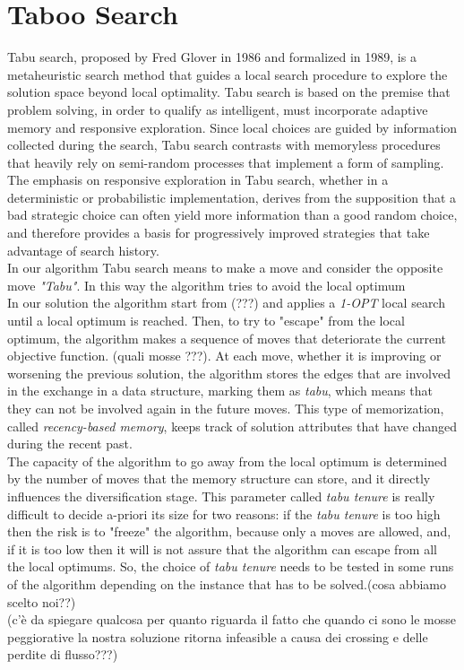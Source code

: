 \section{Taboo Search}
Tabu search, proposed by Fred Glover in 1986 and formalized in 1989, is a metaheuristic search method that guides a local search procedure to explore the solution space beyond local optimality. Tabu search is based on the premise that problem solving, in order to qualify as intelligent, must incorporate adaptive memory and responsive exploration. Since local choices are guided by information collected during the search, Tabu search contrasts with memoryless procedures that heavily rely on semi-random processes that implement a form of sampling. The emphasis on responsive exploration in Tabu search, whether in a deterministic or probabilistic implementation, derives from the supposition that a bad strategic choice can often yield more information than a good random choice, and therefore provides a basis for progressively improved strategies that take advantage of search history.\\
In our algorithm Tabu search means to make a move and consider the opposite move \textit{"Tabu"}. In this way the algorithm tries to avoid the local optimum\\
In our solution the algorithm start from (???) and applies a \textit{1-OPT} local search until a local optimum is reached. Then, to try to "escape" from the local optimum, the algorithm makes a sequence of moves that deteriorate the current objective function. (quali mosse ???). At each move, whether it is improving or worsening the previous solution, the algorithm stores the edges that are involved in the exchange in a data structure, marking them as \textit{tabu}, which means that they can not be involved again in the future moves. This type of memorization, called \textit{recency-based memory}, keeps track of solution attributes that have changed during the recent past.\\
The capacity of the algorithm to go away from the local optimum is determined by the number of moves that the memory structure can store, and it directly influences the diversification stage. This parameter called \textit{tabu tenure} is really difficult to decide a-priori its size for two reasons: if the \textit{tabu tenure} is too high then the risk is to "freeze" the algorithm, because only a moves are allowed, and, if it is too low then it will is not assure that the algorithm can escape from all
the local optimums. So, the choice of \textit{tabu tenure} needs to be tested in some runs of the algorithm depending on the instance that has to be solved.(cosa abbiamo scelto noi??)\\
(c'è da spiegare qualcosa per quanto riguarda il fatto che quando ci sono le mosse peggiorative la nostra soluzione ritorna infeasible a causa dei crossing e delle perdite di flusso???)
